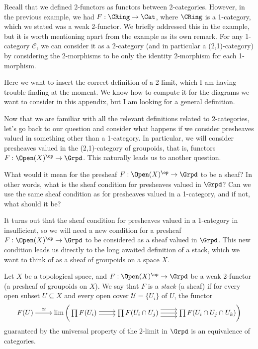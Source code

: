 \begin{remark}
Recall that we defined 2-functors as functors between 2-categories. However, in the previous example, we had $F: \CRing \to \Cat$, where $\CRing$ is a 1-category, which we stated was a weak 2-functor. We briefly addressed this in the example, but it is worth mentioning apart from the example as its own remark. For any 1-category $\mathcal{C}$, we can consider it as a 2-category (and in particular a (2,1)-category) by considering the 2-morphisms to be only the identity 2-morphism for each 1-morphism.
\end{remark}
\begin{definition}
Here we want to insert the correct definition of a 2-limit, which I am having trouble finding at the moment. We know how to compute it for the diagrams we want to consider in this appendix, but I am looking for a general definition.
\end{definition}
Now that we are familiar with all the relevant definitions related to 2-categories, let's go back to our question and consider what happens if we consider presheaves valued in something other than a 1-category. In particular, we will consider presheaves valued in the (2,1)-category of groupoids, that is, functors $F: \Open(X)^{\op} \to \Grpd$. This naturally leads us to another question.
\begin{question}
What would it mean for the presheaf $F: \Open(X)^{\op} \to \Grpd$ to be a sheaf? In other words, what is the sheaf condition for presheaves valued in $\Grpd$? Can we use the same sheaf condition as for presheaves valued in a 1-category, and if not, what should it be?
\end{question}
It turns out that the sheaf condition for presheaves valued in a 1-category in insufficient, so we will need a new condition for a presheaf $F: \Open(X)^{\op} \to \Grpd$ to be considered as a sheaf valued in $\Grpd$. This new condition leads us directly to the long awaited definition of a stack, which we want to think of as a sheaf of groupoids on a space $X$.
\begin{definition}
Let $X$ be a topological space, and $F: \Open(X)^{\op} \to \Grpd$ be a weak 2-functor (a presheaf of groupoids on $X$). We say that $F$ is a \textit{stack} (a sheaf) if for every open subset $U \subseteq X$ and every open cover $\mathcal{U} = \{U_i\}$ of $U$, the functor
\[\begin{tikzcd}[cramped]
	{F(U)} & {\lim \bigg( \prod F(U_i)} & {\prod F(U_i \cap U_j)} & {\prod F(U_i \cap U_j \cap U_k) \bigg)}
	\arrow["\cong", from=1-1, to=1-2]
	\arrow[shift right, from=1-2, to=1-3]
	\arrow[shift left, from=1-2, to=1-3]
	\arrow[from=1-3, to=1-4]
	\arrow[shift left=2, from=1-3, to=1-4]
	\arrow[shift right=2, from=1-3, to=1-4]
\end{tikzcd}\]
guaranteed by the universal property of the $2$-limit in $\Grpd$ is an equivalence of categories.
\end{definition}

